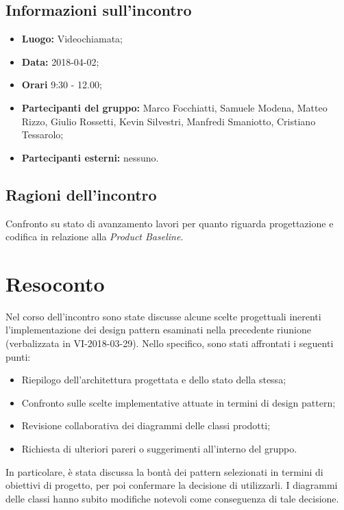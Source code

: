 \documentclass[openany,12pt,a4paper]{article}
\begin{document}
  \subsection{Informazioni sull'incontro} 
   
  \begin{itemize}  
      \item \textbf{Luogo:} Videochiamata;
      \item \textbf{Data:} 2018-04-02; 
      \item \textbf{Orari} 9:30 - 12.00;
      \item \textbf{Partecipanti del gruppo:} Marco Focchiatti, Samuele Modena, Matteo Rizzo, Giulio Rossetti, Kevin Silvestri, Manfredi Smaniotto, Cristiano Tessarolo;
      \item \textbf{Partecipanti esterni:} nessuno. 
  \end{itemize} 
 
  \subsection{Ragioni dell'incontro} 
  Confronto su stato di avanzamento lavori per quanto riguarda progettazione e codifica in relazione alla \textit{Product Baseline}.
 
  \section{Resoconto} 
  Nel corso dell'incontro sono state discusse alcune scelte progettuali inerenti l'implementazione dei design pattern esaminati nella precedente riunione (verbalizzata in VI-2018-03-29). Nello specifico, sono stati affrontati i seguenti punti:
	
  \begin{itemize}
	\item Riepilogo dell'architettura progettata e dello stato della stessa;
	\item Confronto sulle scelte implementative attuate in termini di design pattern;
	\item Revisione collaborativa dei diagrammi delle classi prodotti;
	\item Richiesta di ulteriori pareri o suggerimenti all'interno del gruppo.
  \end{itemize}

  \noindent In particolare, è stata discussa la bontà dei pattern selezionati in termini di obiettivi di progetto, per poi confermare la decisione di utilizzarli. I diagrammi delle classi hanno subito modifiche notevoli come conseguenza di tale decisione. 
 
\end{document}
